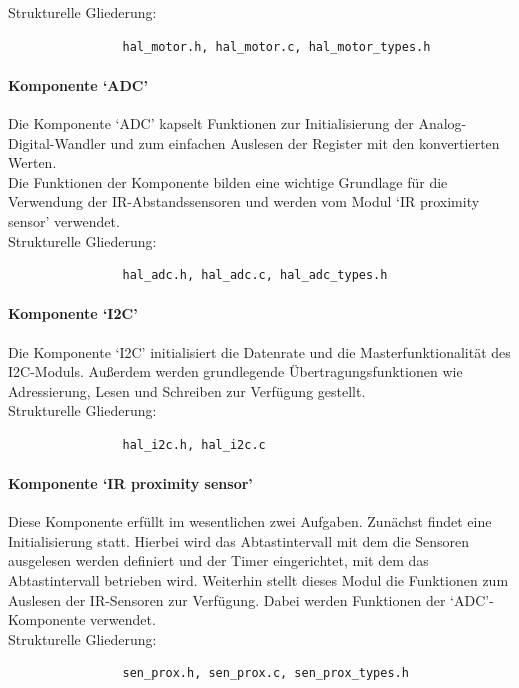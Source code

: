 \documentclass[10pt,a4paper]{article}
\begin{document}
			Strukturelle Gliederung:
				\begin{verbatim}  
				hal_motor.h, hal_motor.c, hal_motor_types.h
				\end{verbatim}
						
			\paragraph*{Komponente `ADC'}
			Die Komponente `ADC' kapselt Funktionen zur Initialisierung der Analog-Digital-Wandler und zum einfachen Auslesen der Register
			mit den konvertierten Werten. \\
			Die Funktionen der Komponente bilden eine wichtige Grundlage für die Verwendung der IR-Abstandssensoren und werden vom Modul `IR 
			proximity sensor' verwendet.\\
			
			Strukturelle Gliederung:
				\begin{verbatim}  
				hal_adc.h, hal_adc.c, hal_adc_types.h
				\end{verbatim}
			
			\paragraph*{Komponente `I2C'}
			Die Komponente `I2C' initialisiert die Datenrate und die Masterfunktionalität des I2C-Moduls.
			Außerdem werden grundlegende Übertragungsfunktionen wie Adressierung, Lesen und Schreiben zur Verfügung gestellt. \\
			
			Strukturelle Gliederung:
				\begin{verbatim}  
				hal_i2c.h, hal_i2c.c
				\end{verbatim}
			
			\paragraph*{Komponente `IR proximity sensor'}
			Diese Komponente erfüllt im wesentlichen zwei Aufgaben.
			Zunächst findet eine Initialisierung statt. Hierbei wird das Abtastintervall mit dem die Sensoren ausgelesen werden definiert und der 
			Timer eingerichtet, mit dem das Abtastintervall betrieben wird.
			Weiterhin stellt dieses Modul die Funktionen zum Auslesen der IR-Sensoren zur Verfügung. Dabei werden Funktionen der `ADC'-Komponente 		
			verwendet. \\
			
			Strukturelle Gliederung:
				\begin{verbatim}  
				sen_prox.h, sen_prox.c, sen_prox_types.h
				\end{verbatim}
			
\end{document}
